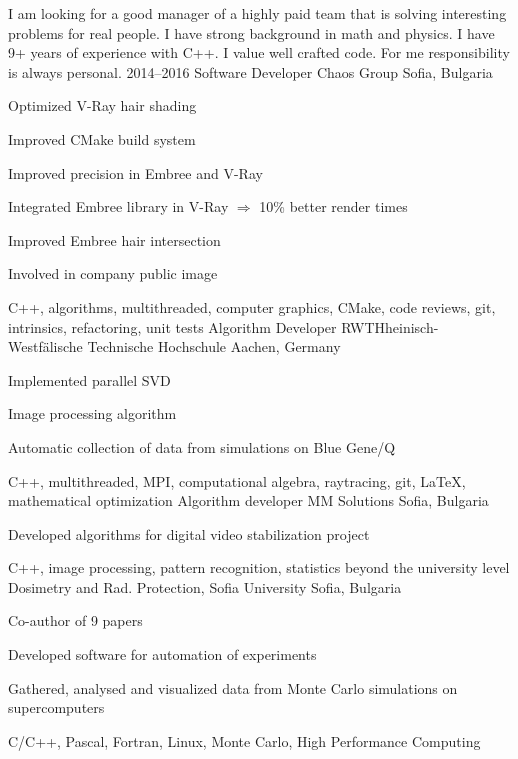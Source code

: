 I am looking for a good manager of a highly paid team that is solving
interesting problems for real people. I have strong background in math
and physics. I have 9+ years of experience with C++. I value well
crafted code. For me responsibility is always personal.
\myjobb
{2014--2016}
{Software Developer}
{Chaos Group}
{Sofia, Bulgaria}
{
\item Optimized V-Ray hair shading
\item Improved CMake build system 
\item Improved precision in Embree and V-Ray
}
{
\item Integrated Embree library in V-Ray $\Rightarrow$ 10\% better render times 
\item Improved Embree hair intersection 
\item Involved in company public image
}
{C++, algorithms, multithreaded, computer graphics, CMake, code reviews, git, intrinsics, refactoring, unit tests}
{Algorithm Developer}
{RWTHheinisch-Westfälische Technische Hochschule}
{Aachen, Germany}
{
 \item Implemented parallel SVD
 \item Image processing algorithm
}
{
\item Automatic collection of data from simulations on Blue Gene/Q
}
{C++, multithreaded, MPI, computational algebra, raytracing, git, \LaTeX, mathematical optimization}
{Algorithm developer}
{MM Solutions}
{Sofia, Bulgaria}
{ \item Developed algorithms for digital video stabilization project}
{C++, image processing, pattern recognition, statistics beyond the university level}
{Dosimetry and Rad. Protection, Sofia University} {Sofia, Bulgaria}
{
 \item Co-author of 9 papers
 \item Developed software for automation of experiments
}
{ 
 \item Gathered, analysed and visualized data from Monte Carlo simulations on supercomputers
}
{C/C++, Pascal, Fortran, Linux, Monte Carlo, High Performance Computing}
